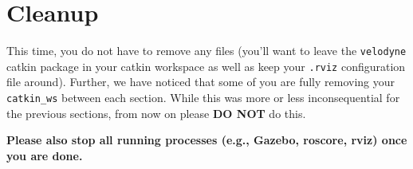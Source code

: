 \documentclass{article}
\begin{document}
\section{Cleanup}

This time, you do not have to remove any files (you'll want to leave the \texttt{velodyne} catkin package in your catkin workspace as well as keep your \texttt{.rviz} configuration file around). Further, we have noticed that some of you are fully removing your \texttt{catkin\_ws} between each section. While this was more or less inconsequential for the previous sections, from now on please \textbf{DO NOT} do this. 

\textbf{Please also stop all running processes (e.g., Gazebo, roscore, rviz) once you are done.}
\end{document}
